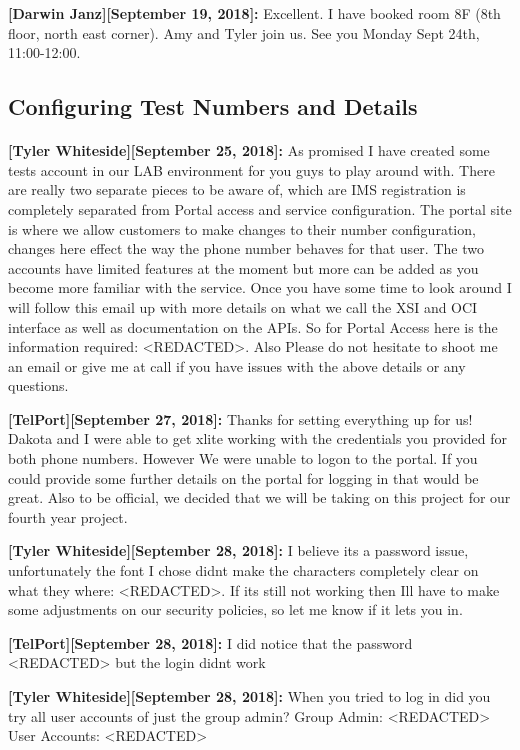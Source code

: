 \documentclass[12pt]{article}
\begin{document}
\textbf{[Darwin Janz][September 19, 2018]:} Excellent.  I have booked room 8F (8th floor, north east corner). Amy and Tyler join us. See you Monday Sept 24th, 11:00-12:00.

\subsection{Configuring Test Numbers and Details}

\paragraph{}
\textbf{[Tyler Whiteside][September 25, 2018]:} As promised I have created some tests account in our LAB environment for you guys to play around with. There are really two separate pieces to be aware of, which are IMS registration is completely separated from Portal access and service configuration.  The portal site is where we allow customers to make changes to their number configuration, changes here effect the way the phone number behaves for that user.   The two accounts have limited features at the moment but more can be added as you become more familiar with the service.  Once you have some time to look around I will follow this email up with more details on what we call the XSI and OCI interface as well as documentation on the APIs. 
So for Portal Access here is the information required: <REDACTED>. Also Please do not hesitate to shoot me an email or give me at call if you have issues with the above details or any questions.


\textbf{[TelPort][September 27, 2018]:} Thanks for setting everything up for us! Dakota and I were able to get xlite working with the credentials you provided for both phone numbers. However We were unable to logon to the portal. If you could provide some further details on the portal for logging in that would be great. Also to be official, we decided that we will be taking on this project for our fourth year project.


\textbf{[Tyler Whiteside][September 28, 2018]:} I believe its a password issue, unfortunately the font I chose didnt make the characters completely clear on what they where: <REDACTED>. If its still not working then Ill have to make some adjustments on our security policies, so let me know if it lets you in.


\textbf{[TelPort][September 28, 2018]:} I did notice that the password <REDACTED> but the login didnt work

\textbf{[Tyler Whiteside][September 28, 2018]:} When you tried to log in did you try all user accounts of just the group admin? Group Admin: <REDACTED> User Accounts:  <REDACTED>
\end{document}
